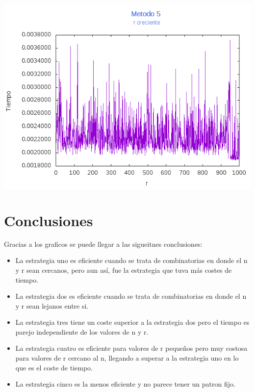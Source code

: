 \documentclass[12pt,letterpaper]{scrartcl}
\begin{document}
\includegraphics[scale=1]{Metodo5/plot1m5}

\newpage
\section{Conclusiones}

Gracias a los graficos se puede llegar a las sigueitnes conclusiones:

\begin{itemize}
\item La estrategia uno es eficiente cuando se trata de combinatorias en donde el n y r sean cercanos, pero aun así, fue la estrategia que tuva más costes de tiempo.
\item La estrategia dos es eficiente cuando se trata de combinatorias en donde el n y r sean lejanos entre si.
\item La estrategia tres tiene un coste superior a la estrategia dos pero el tiempo es parejo independiente de los valores de n y r.
\item La estrategia cuatro es eficiente para valores de r pequeños pero muy costosa para valores de r cercano al n, llegando a superar a la estrategia uno en lo que es el coste de tiempo.
\item La estrategia cinco es la menos eficiente y no parece tener un patron fijo.			
\end{itemize}
\end{document}
